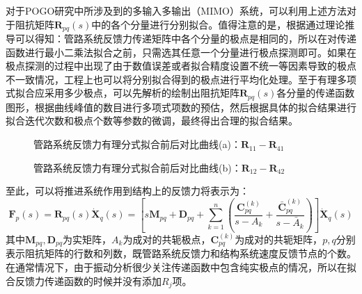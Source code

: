 对于POGO研究中所涉及到的多输入多输出（MIMO）系统，可以利用上述方法对于阻抗矩阵$\boldsymbol{R}_{pq}(s)$中的各个分量进行分别拟合。值得注意的是，根据通过理论推导可以得知：管路系统反馈力传递矩阵中各个分量的极点是相同的，所以在对传递函数进行最小二乘法拟合之前，只需选其任意一个分量进行极点探测即可。如果在极点探测的过程中出现了由于数值误差或者拟合精度设置不统一等因素导致的极点不一致情况，工程上也可以将分别拟合得到的极点进行平均化处理。至于有理多项式拟合应采用多少极点，可以先解析的绘制出阻抗矩阵$\boldsymbol{R}_{pq}(s)$各分量的传递函数图形，根据曲线峰值的数目进行多项式项数的预估，然后根据具体的拟合结果进行拟合迭代次数和极点个数等参数的微调，最终得出合理的拟合结果。

\begin{figure}[p]
  \centering
  \caption{管路系统反馈力有理分式拟合前后对比曲线(a)：$\boldsymbol{R}_{11}-\boldsymbol{R}_{41}$}
  \label{Rational-Fitted-VS-01}
  \vspace{1.2em}
  \caption{管路系统反馈力有理分式拟合前后对比曲线(b)：$\boldsymbol{R}_{12}-\boldsymbol{R}_{42}$}
  \label{Rational-Fitted-VS-02}
\end{figure}

至此，可以将推进系统作用到结构上的反馈力将表示为：
\begin{equation}
  \label{eq:Rational-Feedback-Force}
  \boldsymbol{F}_p(s)= \boldsymbol{R}_{pq}(s)\boldsymbol{\dot{X}}_q(s)
  =\left[ s\boldsymbol{M}_{pq}+ \boldsymbol{D}_{pq}+ \sum_{k=1}^n
    \left( \frac{\boldsymbol{C}_{pq}^{(k)}}{s-{A}_k} +
    \frac{\bar{\boldsymbol{C}}_{pq}^{(k)}}{s-\bar{A}_k}  \right)
    \right] \boldsymbol{\dot{X}}_q(s)
\end{equation}
其中$\boldsymbol{M}_{pq}, \boldsymbol{D}_{pq}$为实矩阵，${A}_k$为成对的共轭极点，$\boldsymbol{C}_{pq}^{(k)}$为成对的共轭矩阵，$p,q$分别表示阻抗矩阵的行数和列数，既管路系统反馈力和结构系统速度反馈节点的个数。在通常情况下，由于振动分析很少关注传递函数中包含纯实极点的情况，所以在拟合反馈力传递函数的时候并没有添加$R_j$项。

